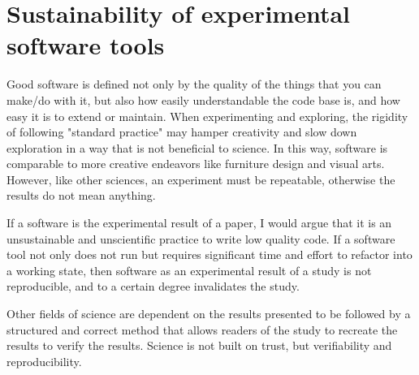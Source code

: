 


\section{Sustainability of experimental software tools}

Good software is defined not only by the quality of the things that you can make/do with it, but also how easily understandable the code base is, and how easy it is to extend or maintain. When experimenting and exploring, the rigidity of following "standard practice" may hamper creativity and slow down exploration in a way that is not beneficial to science. In this way, software is comparable to more creative endeavors like furniture design and visual arts. However, like other sciences, an experiment must be repeatable, otherwise the results do not mean anything. 


If a software is the experimental result of a paper, I would argue that it is an unsustainable and unscientific practice to write low quality code. If a software tool not only does not run but requires significant time and effort to refactor into a working state, then software as an experimental result of a study is not reproducible, and to a certain degree invalidates the study.

Other fields of science are dependent on the results presented to be followed by a structured and correct method that allows readers of the study to recreate the results to verify the results. Science is not built on trust, but verifiability and reproducibility.